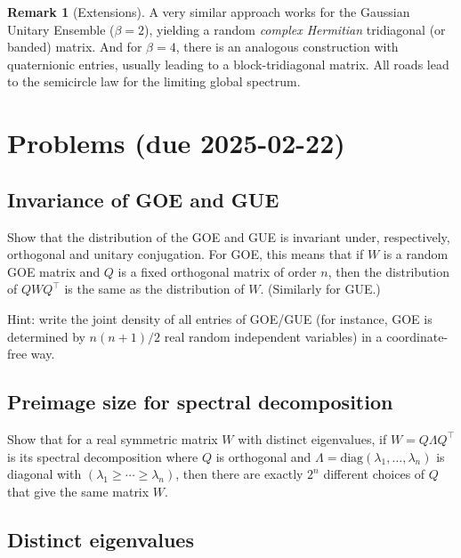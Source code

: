 \documentclass[letterpaper,11pt,oneside,reqno]{article}
\numberwithin{equation}{section}
\theoremstyle{definition}
\newtheorem{remark}[proposition]{Remark}
\begin{document}
\begin{remark}[Extensions]
A very similar approach works for the Gaussian Unitary Ensemble (\(\beta=2\)), yielding a random \emph{complex Hermitian} tridiagonal (or banded) matrix.  And for \(\beta=4\), there is an analogous construction with quaternionic entries, usually leading to a block-tridiagonal matrix.  All roads lead to the semicircle law for the limiting global spectrum.
\end{remark}


\appendix
\setcounter{section}{2}

\section{Problems (due 2025-02-22)}

\subsection{Invariance of GOE and GUE}
\label{prob:invariance_GOE_GUE}

Show that the distribution of the GOE and GUE is
invariant under, respectively, orthogonal and unitary conjugation.
For GOE, this means that if \(W\)
is a random GOE matrix and \(Q\) is a fixed orthogonal
matrix of order $n$, then the distribution
of \(QWQ^\top\) is the same as the distribution of \(W\).
(Similarly for GUE.)

\medskip
\noindent
Hint: write the joint density of all entries of GOE/GUE (for instance, GOE
is determined by $n(n+1)/2$ real random independent variables)
in a coordinate-free way.


\subsection{Preimage size for spectral decomposition}
\label{prob:GOE-preimage}

Show that for a real symmetric matrix $W$ with distinct eigenvalues,
if $W=Q\Lambda Q^\top$ is its spectral decomposition
where $Q$ is orthogonal and $\Lambda=\mathrm{diag}(\lambda_1,\ldots,\lambda_n)$
is diagonal with $(\lambda_1\ge \cdots\ge \lambda_n)$,
then there are exactly $2^n$ different choices of $Q$
that give the same matrix $W$.

\subsection{Distinct eigenvalues}
\label{prob:distinct-eigenvalues}
\end{document}
